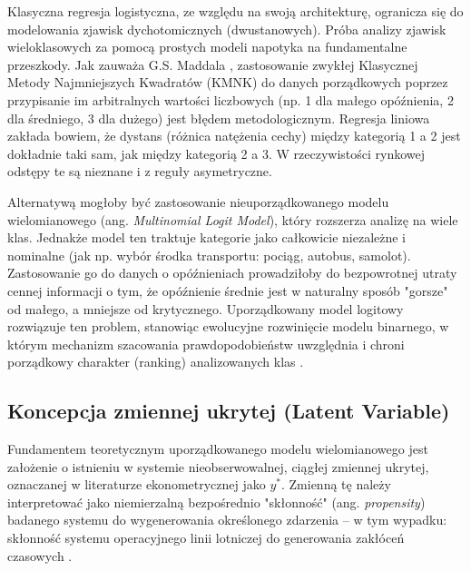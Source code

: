 Klasyczna regresja logistyczna, ze względu na swoją architekturę, ogranicza się do modelowania zjawisk dychotomicznych (dwustanowych). Próba analizy zjawisk wieloklasowych za pomocą prostych modeli napotyka na fundamentalne przeszkody. Jak zauważa G.S. Maddala \cite{maddala1983}, zastosowanie zwykłej Klasycznej Metody Najmniejszych Kwadratów (KMNK) do danych porządkowych poprzez przypisanie im arbitralnych wartości liczbowych (np. 1 dla małego opóźnienia, 2 dla średniego, 3 dla dużego) jest błędem metodologicznym. Regresja liniowa zakłada bowiem, że dystans (różnica natężenia cechy) między kategorią 1 a 2 jest dokładnie taki sam, jak między kategorią 2 a 3. W rzeczywistości rynkowej odstępy te są nieznane i z reguły asymetryczne. 

Alternatywą mogłoby być zastosowanie nieuporządkowanego modelu wielomianowego (ang. \textit{Multinomial Logit Model}), który rozszerza analizę na wiele klas. Jednakże model ten traktuje kategorie jako całkowicie niezależne i nominalne (jak np. wybór środka transportu: pociąg, autobus, samolot). Zastosowanie go do danych o opóźnieniach prowadziłoby do bezpowrotnej utraty cennej informacji o tym, że opóźnienie średnie jest w naturalny sposób "gorsze" od małego, a mniejsze od krytycznego. Uporządkowany model logitowy rozwiązuje ten problem, stanowiąc ewolucyjne rozwinięcie modelu binarnego, w którym mechanizm szacowania prawdopodobieństw uwzględnia i chroni porządkowy charakter (ranking) analizowanych klas \cite{greene2003}.

\subsection{Koncepcja zmiennej ukrytej (Latent Variable)}

Fundamentem teoretycznym uporządkowanego modelu wielomianowego jest założenie o istnieniu w systemie nieobserwowalnej, ciągłej zmiennej ukrytej, oznaczanej w literaturze ekonometrycznej jako $y^*$. Zmienną tę należy interpretować jako niemierzalną bezpośrednio "skłonność" (ang. \textit{propensity}) badanego systemu do wygenerowania określonego zdarzenia – w tym wypadku: skłonność systemu operacyjnego linii lotniczej do generowania zakłóceń czasowych \cite{greene2003}. 

